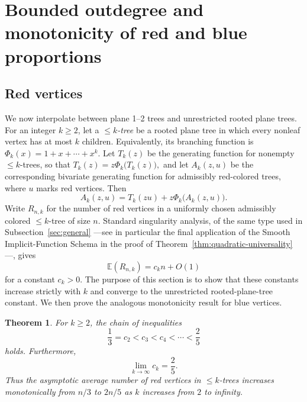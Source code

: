 \documentclass[11pt, onesided]{amsart}
\newtheorem{theorem}{Theorem}[section]
\theoremstyle{remark}
\begin{document}
\section{Bounded outdegree and monotonicity of red and blue proportions}
\label{sec:bounded-outdegree}

\subsection{Red vertices}

We now interpolate between plane 1--2 trees and unrestricted rooted plane trees.  For an integer $k\ge 2$, let a \emph{$\leq k$-tree} be a rooted plane tree in which every nonleaf vertex has at most $k$ children.  Equivalently, its branching function is
$
\Phi_k(x)=1+x+\cdots+x^k.
$
Let $T_k(z)$ be the generating function for nonempty $\leq k$-trees, so that
$
T_k(z)=z\Phi_k\big(T_k(z)\big),
$
and let $A_k(z,u)$ be the corresponding bivariate generating function for admissibly red-colored trees, where $u$ marks red vertices.  Then
\[
A_k(z,u)=T_k(zu)+z\Phi_k\big(A_k(z,u)\big).
\]
Write $R_{n,k}$ for the number of red vertices in a uniformly chosen admissibly colored $\leq k$-tree of size $n$.  Standard singularity analysis, of the same type used in Subsection~\ref{sec:general} ---see in particular the final application of the Smooth Implicit-Function Schema in the proof of Theorem~\ref{thm:quadratic-universality}---, gives
\[
\mathbb E(R_{n,k})=c_k n+O(1)
\]
for a constant $c_k>0$.  The purpose of this section is to show that these constants increase strictly with $k$ and converge to the unrestricted rooted-plane-tree constant. We then prove the analogous monotonicity result for blue vertices.

\begin{theorem} \label{red-monotone}
For $k\ge 2$, the chain of inequalities
\[
\frac13=c_2<c_3<c_4<\cdots<\frac25 \] holds.
Furthermore, 
\[
\lim_{k\to\infty}c_k=\frac25.
\]
Thus the asymptotic average number of red vertices in $\leq k$-trees increases monotonically from $n/3$ to $2n/5$ as $k$ increases from $2$ to infinity.
\end{theorem}
\end{document}
